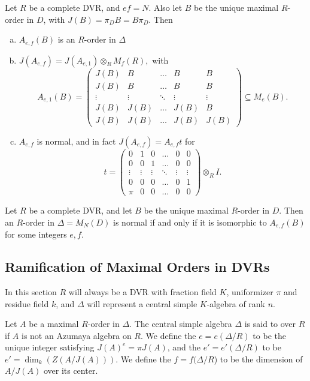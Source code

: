 \begin{lem}\mbox{}
Let $R$ be a complete DVR, and $ef=N$.  Also let $B$ be the unique maximal $R$-order in $D$, with $J(B) = \pi_DB =B\pi_D$.  Then
\begin{enumerate}[(a)]
\item  $A_{e,f}(B)$ is an $R$-order in $\Delta$
\item  $J(A_{e,f}) = J(A_{e,1})\otimes_R M_{f}(R),$ with
$$A_{e,1}(B)= \left(\begin{array}{ccccc}
J(B)   &  B     & \dots  & B      & B\\
J(B)   &  B     & \dots  & B      & B\\
\vdots & \vdots & \ddots & \vdots & \vdots\\
J(B)   & J(B)   & \dots  & J(B)   & B\\
J(B)   & J(B)   & \dots  & J(B)   & J(B)
\end{array}\right)\subseteq M_e(B).$$
\item  $A_{e,f}$ is normal, and in fact $J(A_{e,f}) = A_{e,f}t$ for
$$t = \left(\begin{array}{cccccc}
0      &  1     & 0      & \dots  &  0     & 0\\
0      &  0     & 1      & \dots  &  0     & 0\\
\vdots & \vdots & \vdots & \ddots & \vdots & \vdots\\
0      &  0     & 0      & \dots  &  0     & 1\\
\pi    &  0     & 0      & \dots  &  0     & 0
\end{array}\right)\otimes_R I.$$
\end{enumerate}
\end{lem}

\begin{thm}
Let $R$ be a complete DVR, and let $B$ be the unique maximal $R$-order in $D$.  Then an $R$-order in $\Delta = M_N(D)$ is normal if and only if it is isomorphic to $A_{e,f}(B)$ for some integers $e,f$.
\end{thm}

\subsection{Ramification of Maximal Orders in DVRs}
In this section $R$ will always be a DVR with fraction field $K$, uniformizer $\pi$ and residue field $k$, and $\Delta$ will represent a central simple $K$-algebra of rank $n$.
\begin{defn}
Let $A$ be a maximal $R$-order in $\Delta$.  The central simple algebra $\Delta$ is said to  over $R$ if $A$ is not an Azumaya algebra on $R$.  We define the  $e = e(\Delta/R)$ to be the unique integer satisfying $J(A)^e = \pi J(A)$, and the  $e' = e'(\Delta/R)$ to be $e' = \dim_k(Z(A/J(A)))$.  We define the  $f = f(\Delta/R$) to be the dimension of $A/J(A)$ over its center.
\end{defn}

